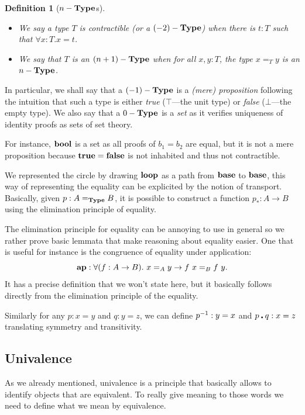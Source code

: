 \documentclass[11pt]{article}
\theoremstyle{plain}
\newtheorem{definition}[theorem]{Definition}
\theoremstyle{remark}
\begin{document}
\begin{definition}[$n-\operatorname{\mathbf{Type}}$s]
  \leavevmode
  \begin{itemize}
    \item We say a type $T$ is \emph{contractible} (or a $(-2)-\operatorname{\mathbf{Type}}$) when
          there is $t : T$ such that $\forall x : T. x = t$.
    \item We say that $T$ is an $(n+1)-\operatorname{\mathbf{Type}}$ when for all $x, y : T$, the type
          $x =_T y$ is an $n-\operatorname{\mathbf{Type}}$.
  \end{itemize}
\end{definition}
%
\noindent
In particular, we shall say that a $(-1)-\operatorname{\mathbf{Type}}$ is a \emph{(mere) proposition}
following the intuition that such a type is either \emph{true} ($\top$---the
unit type) or \emph{false} ($\bot$---the empty type).
We also say that a $0-\operatorname{\mathbf{Type}}$ is a \emph{set} as it verifies uniqueness of
identity proofs as sets of set theory.

For instance, $\operatorname{\mathbf{bool}}$ is a set as all proofs of $b_1 = b_2$ are equal, but it
is not a mere proposition because $\operatorname{\mathbf{true}} = \operatorname{\mathbf{false}}$ is not inhabited and thus
not contractible.

We represented the circle by drawing $\operatorname{\mathbf{loop}}$ as a path from $\operatorname{\mathbf{base}}$ to
$\operatorname{\mathbf{base}}$, this way of representing the equality can be explicited by the notion
of transport.
Basically, given $p : A =_{\operatorname{\mathbf{Type}}} B$, it is possible to construct a function
$p_* : A \to B$ using the elimination principle of equality.

The elimination principle for equality can be annoying to use in general so we
rather prove basic lemmata that make reasoning about equality easier.
One that is useful for instance is the congruence of equality under application:
\[ \operatorname{\mathbf{ap}} : \forall (f : A \to B).\ x =_A y \to f\ x =_B f\ y. \]
\noindent
It has a precise definition that we won't state here, but it basically
follows directly from the elimination principle of the equality.

Similarly for any $p : x = y$ and $q : y = z$, we can define
$p^{-1} : y = x$ and $p \centerdot q : x = z$ translating symmetry and transitivity.

\subsection{Univalence}

As we already mentioned, univalence is a principle that basically allows to
identify objects that are equivalent. To really give meaning to those words we
need to define what we mean by equivalence.
\end{document}
